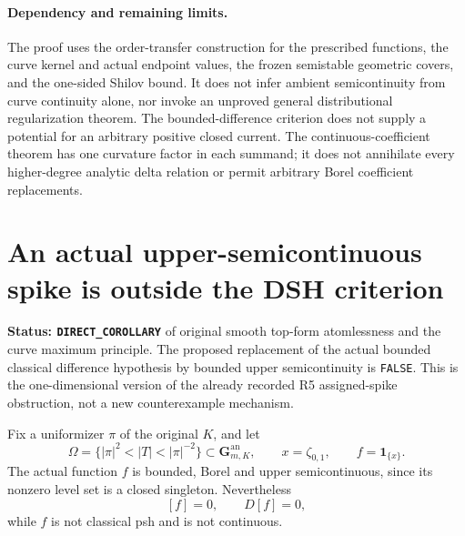 \documentclass[11pt,a4paper]{article}
\numberwithin{equation}{section}
\theoremstyle{definition}
\theoremstyle{remark}
\begin{document}
\paragraph{Dependency and remaining limits.}
The proof uses the order-transfer construction for the prescribed
functions, the curve kernel and actual endpoint values, the frozen
semistable geometric covers, and the one-sided Shilov bound. It does
not infer ambient semicontinuity from curve continuity alone, nor
invoke an unproved general distributional regularization theorem.
The bounded-difference criterion does not supply a potential for an
arbitrary positive closed current. The continuous-coefficient theorem
has one curvature factor in each summand; it does not annihilate every
higher-degree analytic delta relation or permit arbitrary Borel
coefficient replacements.



\section{An actual upper-semicontinuous spike is outside the DSH criterion}
\label{sec:r6-actual-spike-scope}

\noindent\textbf{Status: \texttt{DIRECT\_COROLLARY}} of original
smooth top-form atomlessness and the curve maximum principle. The
proposed replacement of the actual bounded classical difference
hypothesis by bounded upper semicontinuity is \texttt{FALSE}.
This is the one-dimensional version of the already recorded R5
assigned-spike obstruction, not a new counterexample mechanism.

Fix a uniformizer $\pi$ of the original $K$, and let
\[
 \Omega=\{|\pi|^2<|T|<|\pi|^{-2}\}
                  \subset\mathbf G_{m,K}^{\mathrm{an}},
 \qquad x=\zeta_{0,1},\qquad f=\mathbf1_{\{x\}}.
\]
The actual function $f$ is bounded, Borel and upper semicontinuous,
since its nonzero level set is a closed singleton. Nevertheless
\[
                         [f]=0,\qquad D[f]=0,
\]
while $f$ is not classical psh and is not continuous.
\end{document}

